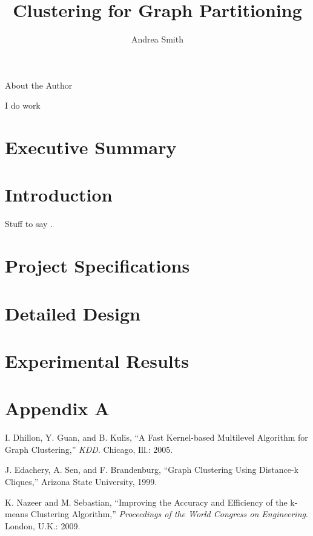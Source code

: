 \documentclass{article}
\title{Clustering for Graph Partitioning}
\author{Andrea Smith}
\begin{document}
\begin{titlingpage}
\setlength{\droptitle}{30pt}
\maketitle
\begin{center}
{\selectfont
\large\centerline{About the Author}
}
I do work
\end{center}
\end{titlingpage}

\tableofcontents
\newpage

\section{Executive Summary}
\section{Introduction}
Stuff to say \cite{kernel,distK}.
\section{Project Specifications}
\section{Detailed Design}
\section{Experimental Results}


\newpage
\section{Appendix A}


\newpage
\begin{thebibliography}{9}

I. Dhillon, Y. Guan, and B. Kulis, ``A Fast Kernel-based Multilevel Algorithm for Graph Clustering,'' \textit{KDD}. Chicago, Ill.: 2005.
 
J. Edachery, A. Sen, and F. Brandenburg, ``Graph Clustering Using Distance-k Cliques,'' Arizona State University, 1999.
 
K. Nazeer and M. Sebastian, ``Improving the Accuracy and Efficiency of the k-means Clustering Algorithm,'' 
\textit{Proceedings of the World Congress on Engineering}. London, U.K.: 2009.

\end{thebibliography}

\begin{comment}
\begin{figure}[!htb]
\begin{center}
	\texttt{[image: puppy.png]}
	\caption{T-Test for Relative Fitness with Parsimony Pressures 0.2 and 0.3}
	\label{tTestMLR}
\end{center}
\end{figure}
\end{comment}
\end{document}

